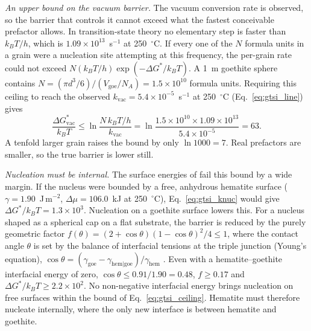 \textit{An upper bound on the vacuum barrier.} The vacuum conversion rate is observed, so the
barrier that controls it cannot exceed what the fastest conceivable prefactor allows. In
transition-state theory \citep{eyring1935} no elementary step is faster than $k_BT/h$, which is
$1.09\times10^{13}$~s$^{-1}$ at 250~$^\circ$C. If every one of the $N$ formula units in a grain were a
nucleation site attempting at this frequency, the per-grain rate could not exceed
$N(k_BT/h)\exp(-\Delta G^{*}/k_BT)$. A 1~\textmu m goethite sphere contains
$N = (\pi d^3/6)/(V_{\mathrm{goe}}/N_A) = 1.5\times10^{10}$ formula units. Requiring this ceiling to
reach the observed $k_{\mathrm{vac}} = 5.4\times10^{-5}$~s$^{-1}$ at 250~$^\circ$C (Eq.~\eqref{eq:gtsi_line})
gives
\begin{equation}
  \frac{\Delta G^{*}_{\mathrm{vac}}}{k_BT} \le \ln\frac{N\,k_BT/h}{k_{\mathrm{vac}}}
  = \ln\frac{1.5\times10^{10}\times1.09\times10^{13}}{5.4\times10^{-5}} = 63 .
  \label{eq:gtsi_ceiling}
\end{equation}
A tenfold larger grain raises the bound by only $\ln 1000 = 7$. Real prefactors are smaller, so the
true barrier is lower still.

\textit{Nucleation must be internal.} The surface energies of \citet{navrotsky2008} fail this
bound by a wide margin. If the nucleus were bounded by a free, anhydrous hematite surface
($\gamma = 1.90$~J\,m$^{-2}$, $\Delta\mu = 106.0$~kJ at 250~$^\circ$C), Eq.~\eqref{eq:gtsi_knuc} would give
$\Delta G^{*}/k_BT = 1.3\times10^{3}$. Nucleation on a goethite surface lowers this. For a nucleus
shaped as a spherical cap on a flat substrate, the barrier is reduced by the purely geometric
factor
$f(\theta) = (2+\cos\theta)(1-\cos\theta)^2/4 \le 1$, where the contact angle $\theta$ is set by the
balance of interfacial tensions at the triple junction (Young's equation),
$\cos\theta = (\gamma_{\mathrm{goe}} - \gamma_{\mathrm{hem|goe}})/\gamma_{\mathrm{hem}}$
\citep{volmer1926,turnbull1950}. Even with a hematite--goethite interfacial energy of zero,
$\cos\theta \le 0.91/1.90 = 0.48$, $f\ge0.17$ and $\Delta G^{*}/k_BT\ge2.2\times10^{2}$. No
non-negative interfacial energy brings nucleation on free surfaces within the bound of
Eq.~\eqref{eq:gtsi_ceiling}. Hematite must therefore nucleate internally, where the only new
interface is between hematite and goethite.

